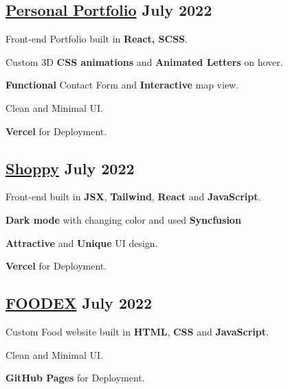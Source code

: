 \subsection{{\href{https://nidhikumari.vercel.app/}{Personal Portfolio} \hfill July 2022}}
\begin{zitemize}
\item Front-end Portfolio built in \textbf{React, SCSS}.
\item Custom 3D \textbf{ CSS animations } and \textbf{Animated Letters }on hover.
\item \textbf{Functional} Contact Form and \textbf{Interactive} map view.
\item Clean and Minimal UI.
\item \textbf{Vercel} for Deployment.
\end{zitemize}

\subsection{{\href{https://shoppy-brown.vercel.app/}{Shoppy} \hfill July 2022}}
\begin{zitemize}
\item Front-end built in \textbf{JSX}, \textbf{Tailwind}, \textbf{React} and \textbf{JavaScript}.
\item \textbf{Dark mode} with changing color and used \textbf{Syncfusion} 
\item \textbf{Attractive} and \textbf{Unique} UI design.
\item \textbf{Vercel} for Deployment.
\end{zitemize}

\subsection{{\href{https://nidhikumari-4.github.io/FoodEx/}{FOODEX} \hfill July 2022}}
\begin{zitemize}
\item Custom Food website built in \textbf{HTML}, \textbf{CSS} and \textbf{JavaScript}.
\item Clean and Minimal UI.
\item \textbf{GitHub Pages} for Deployment.
\end{zitemize}

